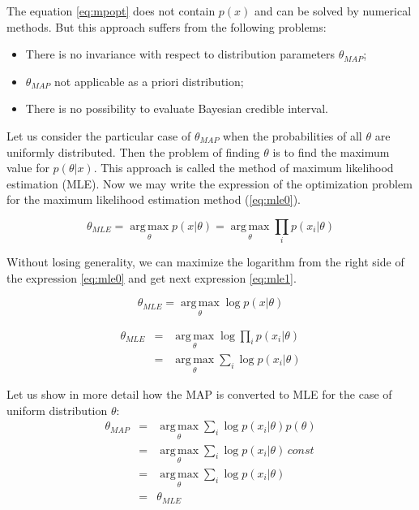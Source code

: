 \documentclass[12pt]{report}
\theoremstyle{definition}
\begin{document}
The equation \ref{eq:mpopt} does not contain  $p \left( x \right)$ and can be solved by numerical methods.
But this approach suffers from the following problems:	

\begin{itemize}
	\item There is no invariance with respect to distribution parameters $\theta_{MAP}$;
	\item $\theta_{MAP}$ not applicable as a priori distribution;
	\item There is no possibility to evaluate Bayesian credible interval.
\end{itemize}

Let us consider the particular case of $\theta_{MAP}$ when the probabilities of all $\theta$ are uniformly distributed. 
Then the problem of finding $\theta$ is to find the maximum value for $p \left( \theta \vert x \right)$. 
This approach is called the method of maximum likelihood estimation (MLE).
Now we may write the expression of the optimization problem for the maximum likelihood estimation method (\ref{eq:mle0}).

\begin{equation} \label{eq:mle0}
\theta_{MLE} = \operatorname*{arg\,max}_\theta p\left( x \vert \theta \right) = \operatorname*{arg\,max}_\theta \prod_i p \left( x_i \vert \theta \right)
\end{equation}

Without losing generality, we can maximize the logarithm from the right side of the expression \ref{eq:mle0} and get next expression \ref{eq:mle1}.

\begin{equation} \label{eq:mle1}
\theta_{MLE} = \operatorname*{arg\,max}_\theta \log p \left( x \vert \theta \right) 
\end{equation}

\begin{eqnarray} \label{eq:mle2}
	\theta_{MLE} & = & \operatorname*{arg\,max}_\theta \log \prod_i p \left( x_i \vert \theta \right) \\
	& = & \operatorname*{arg\,max}_\theta \sum_i \log p \left( x_i \vert \theta \right)
\end{eqnarray}

Let us show in more detail how the MAP is converted to MLE for the case of uniform distribution $\theta$:
\begin{eqnarray} \label{eq:mapmle}
	\theta_{MAP} & = &\operatorname*{arg\,max}_\theta \sum_i \log p \left( x_i \vert \theta \right) p \left( \theta \right) \\
	& = & \operatorname*{arg\,max}_\theta \sum_i \log p \left( x_i \vert \theta \right) \, const \\
	& = & \operatorname*{arg\,max}_\theta \sum_i \log p \left( x_i \vert \theta \right) \\
	& = & \theta_{MLE}
\end{eqnarray}
\end{document}
